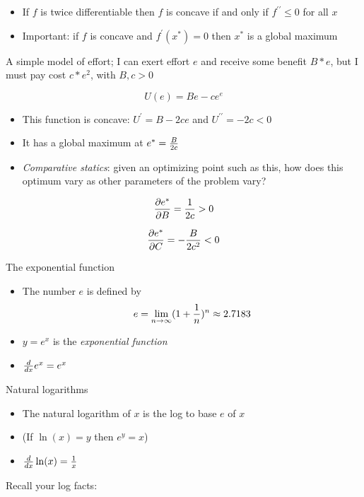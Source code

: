 \documentclass[10pt]{seminar}
\begin{document}
\begin{slide}
\begin{itemize}
\item If $f$ is twice differentiable then $f$ is concave if and only if $f^{\prime\prime}\leq 0$ for all $x$

\item Important: if $f$ is concave and $f^\prime(x^*)=0$ then $x^*$ is a global maximum

\end{itemize}

\newslide

A simple model of effort; I can exert effort $e$ and receive some benefit $B*e$, but I must pay cost $c*e^2$, with $B, c>0$

$$U(e)=Be-ce^e$$

\begin{itemize}
\item This function is concave: $U^\prime=B-2ce$ and $U^{\prime\prime}=-2c<0$

\item It has a global maximum at $e^*={{B}\over {2c}}$

\item \textit{Comparative statics}: given an optimizing point such as this, how does this optimum vary as other parameters of the problem vary?

\end{itemize}
 $${\partial e^* \over {\partial B}}={{1}\over{2c}}>0$$

 $${\partial e^* \over {\partial C}}=-{{B}\over{2c^2}}<0$$

\newslide

The exponential function

\begin{itemize}
\item The number $e$ is defined by $$e=\lim_{n\rightarrow\infty}(1+{1\over n})^n \approx 2.7183$$
\item $y=e^x$ is the \textit{exponential function}
\item ${d\over{dx}}e^x=e^x$
\end{itemize}

\newslide
Natural logarithms

\begin{itemize}
\item The natural logarithm of $x$ is the log to base $e$ of $x$ 
\item (If $\ln(x)=y$ then $e^y=x$)
\item ${d\over{dx}}\ln(x)={1\over x}$
\end{itemize}
\vspace{.2in}
Recall your log facts:



\end{slide}
\end{document}
